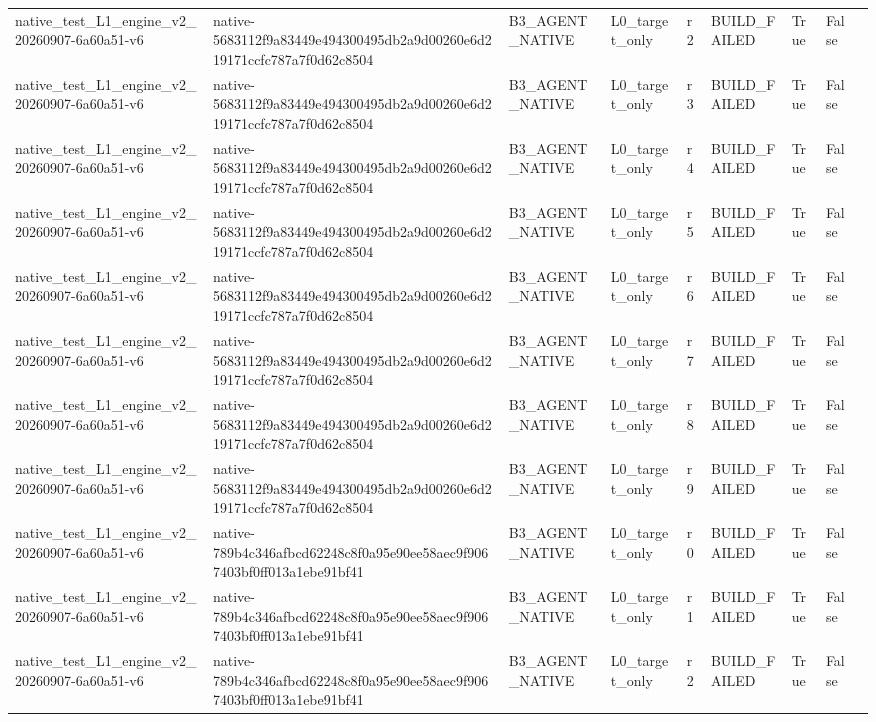\begin{tabular}{lllllllll}
native\_test\_L1\_engine\_v2\_20260907-6a60a51-v6 & native-5683112f9a83449e494300495db2a9d00260e6d219171ccfc787a7f0d62c8504 & B3\_AGENT\_NATIVE & L0\_target\_only & r2 & BUILD\_FAILED & True & False &  \\
native\_test\_L1\_engine\_v2\_20260907-6a60a51-v6 & native-5683112f9a83449e494300495db2a9d00260e6d219171ccfc787a7f0d62c8504 & B3\_AGENT\_NATIVE & L0\_target\_only & r3 & BUILD\_FAILED & True & False &  \\
native\_test\_L1\_engine\_v2\_20260907-6a60a51-v6 & native-5683112f9a83449e494300495db2a9d00260e6d219171ccfc787a7f0d62c8504 & B3\_AGENT\_NATIVE & L0\_target\_only & r4 & BUILD\_FAILED & True & False &  \\
native\_test\_L1\_engine\_v2\_20260907-6a60a51-v6 & native-5683112f9a83449e494300495db2a9d00260e6d219171ccfc787a7f0d62c8504 & B3\_AGENT\_NATIVE & L0\_target\_only & r5 & BUILD\_FAILED & True & False &  \\
native\_test\_L1\_engine\_v2\_20260907-6a60a51-v6 & native-5683112f9a83449e494300495db2a9d00260e6d219171ccfc787a7f0d62c8504 & B3\_AGENT\_NATIVE & L0\_target\_only & r6 & BUILD\_FAILED & True & False &  \\
native\_test\_L1\_engine\_v2\_20260907-6a60a51-v6 & native-5683112f9a83449e494300495db2a9d00260e6d219171ccfc787a7f0d62c8504 & B3\_AGENT\_NATIVE & L0\_target\_only & r7 & BUILD\_FAILED & True & False &  \\
native\_test\_L1\_engine\_v2\_20260907-6a60a51-v6 & native-5683112f9a83449e494300495db2a9d00260e6d219171ccfc787a7f0d62c8504 & B3\_AGENT\_NATIVE & L0\_target\_only & r8 & BUILD\_FAILED & True & False &  \\
native\_test\_L1\_engine\_v2\_20260907-6a60a51-v6 & native-5683112f9a83449e494300495db2a9d00260e6d219171ccfc787a7f0d62c8504 & B3\_AGENT\_NATIVE & L0\_target\_only & r9 & BUILD\_FAILED & True & False &  \\
native\_test\_L1\_engine\_v2\_20260907-6a60a51-v6 & native-789b4c346afbcd62248c8f0a95e90ee58aec9f9067403bf0ff013a1ebe91bf41 & B3\_AGENT\_NATIVE & L0\_target\_only & r0 & BUILD\_FAILED & True & False &  \\
native\_test\_L1\_engine\_v2\_20260907-6a60a51-v6 & native-789b4c346afbcd62248c8f0a95e90ee58aec9f9067403bf0ff013a1ebe91bf41 & B3\_AGENT\_NATIVE & L0\_target\_only & r1 & BUILD\_FAILED & True & False &  \\
native\_test\_L1\_engine\_v2\_20260907-6a60a51-v6 & native-789b4c346afbcd62248c8f0a95e90ee58aec9f9067403bf0ff013a1ebe91bf41 & B3\_AGENT\_NATIVE & L0\_target\_only & r2 & BUILD\_FAILED & True & False &  \\

\end{tabular}
